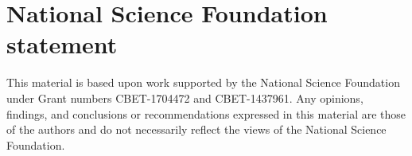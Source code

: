\documentclass[letterpaper,10pt,english]{sphinxmanual}
\begin{document}
\begin{figure}[htbp]
\centering

\noindent{}
\label{\detokenize{Acknowledgements:figure-nsf-logo}}\end{figure}


\section{National Science Foundation statement}
\label{\detokenize{Acknowledgements:national-science-foundation-statement}}
This material is based upon work supported by the National Science Foundation under Grant numbers CBET-1704472 and CBET-1437961. Any opinions, findings, and conclusions or recommendations expressed in this material are those of the authors and do not necessarily reflect the views of the National Science Foundation.
\end{document}
